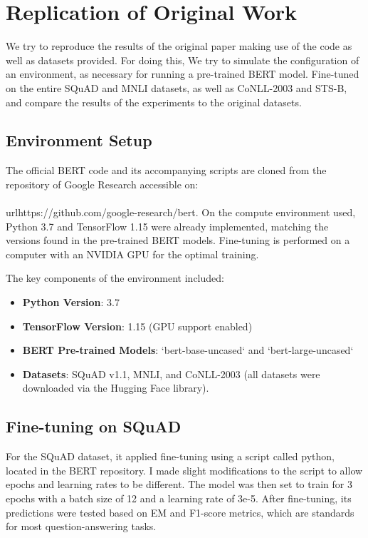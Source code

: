 \documentclass{article}
\begin{document}
\section{Replication of Original Work}
We try to reproduce the results of the original paper making use of the code as well as datasets provided. For doing this,
We try to simulate the configuration of an environment, as necessary for running a pre-trained BERT model.
Fine-tuned on the entire SQuAD and MNLI datasets, as well as CoNLL-2003 and STS-B, and compare the results of the experiments to the original datasets.

\subsection{Environment Setup}
The official BERT code and its accompanying scripts are cloned from the repository of Google Research accessible on: \\\\url{https://github.com/google-research/bert}. On the compute environment used, Python 3.7 and TensorFlow 1.15 were already implemented, matching the versions found in the pre-trained BERT models. Fine-tuning is performed on a computer with an NVIDIA GPU for the optimal training.

The key components of the environment included:
\begin{itemize}
    \item \textbf{Python Version}: 3.7
    \item \textbf{TensorFlow Version}: 1.15 (GPU support enabled)
    \item \textbf{BERT Pre-trained Models}: `bert-base-uncased` and `bert-large-uncased`
    \item \textbf{Datasets}: SQuAD v1.1, MNLI, and CoNLL-2003 (all datasets were downloaded via the Hugging Face library).
\end{itemize}

\subsection{Fine-tuning on SQuAD}
For the SQuAD dataset, it applied fine-tuning using a script called python, located in the BERT repository. I made slight modifications to the script to allow epochs and learning rates to be different. The model was then set to train for 3 epochs with a batch size of 12 and a learning rate of 3e-5. After fine-tuning, its predictions were tested based on EM and F1-score metrics, which are standards for most question-answering tasks.
\end{document}
